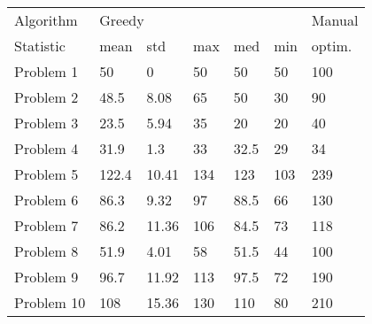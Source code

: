 \begin{tabular}{lllllll}
\toprule
Algorithm & \multicolumn{5}{l}{Greedy} & Manual \\
Statistic &   mean &    std &  max &   med &  min & optim. \\
\midrule
Problem 1  &     50 &      0 &   50 &    50 &   50 &    100 \\
Problem 2  &   48.5 &   8.08 &   65 &    50 &   30 &     90 \\
Problem 3  &   23.5 &   5.94 &   35 &    20 &   20 &     40 \\
Problem 4  &   31.9 &    1.3 &   33 &  32.5 &   29 &     34 \\
Problem 5  &  122.4 &  10.41 &  134 &   123 &  103 &    239 \\
Problem 6  &   86.3 &   9.32 &   97 &  88.5 &   66 &    130 \\
Problem 7  &   86.2 &  11.36 &  106 &  84.5 &   73 &    118 \\
Problem 8  &   51.9 &   4.01 &   58 &  51.5 &   44 &    100 \\
Problem 9  &   96.7 &  11.92 &  113 &  97.5 &   72 &    190 \\
Problem 10 &    108 &  15.36 &  130 &   110 &   80 &    210 \\
\bottomrule
\end{tabular}
